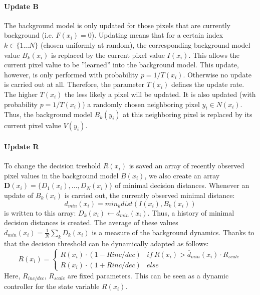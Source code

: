 \paragraph{Update B}
The background model is only updated for those pixels that
are currently background (i.e. $F(x_i) = 0$).
Updating means that for a certain index $k \in \{1...N \}$ (chosen uniformly at random), the corresponding background model
value $B_k(x_i)$ is replaced by the current pixel value $I(x_i)$.
This allows the current pixel value to be ”learned” into
the background model. This update, however, is only performed with probability $p = 1/T(x_i)$. Otherwise no update
is carried out at all. Therefore, the parameter $T(x_i)$ defines
the update rate. The higher $T(x_i)$ the less likely a pixel
will be updated.
It is also updated (with probability $p = 1/T(x_i)$) a randomly chosen neighboring pixel $y_i \in N(x_i)$. Thus, the
background model $B_k(y_i)$ at this neighboring pixel is replaced by its current pixel value $V(y_i)$.
\paragraph{Update R}
To change the decision treshold $R(x_i)$ is saved an array of recently observed pixel values in the background model $B(x_i)$, we also create an array $\mathbf{D}(x_i) = \{D_1(x_i ),...,D_N(x_i)\}$ of minimal decision distances. Whenever an update of $B_k(x_i)$ is carried out, the currently observed minimal distance:
\[ d_{min}(x_i) = min_k dist(I(x_i), B_k(x_i)) \] is written to this array: $D_k(x_i) \leftarrow d_{min}(x_i)$. Thus, a history of minimal decision distances is created. The average of these values $\overline{d}_{min}(x_i) = \frac{1}{N} \sum_k D_k(x_i)$ is a measure of the background dynamics. Thanks to that
the decision threshold can be dynamically adapted as follows:
\begin{equation} \label{eq:R}
R(x_i)=\begin{cases} R(x_i)\cdot(1-R{inc/dec}) &if\ R(x_i)> \overline{d}_{min}(x_i)\cdot R_{scale} \\ R(x_i)\cdot (1+R{inc/dec}) &else  \end{cases}
\end{equation}
Here, $R_{inc/dec}$, $R_{scale}$ are fixed parameters. This can be seen as a dynamic controller for the state variable $R(x_i)$.
